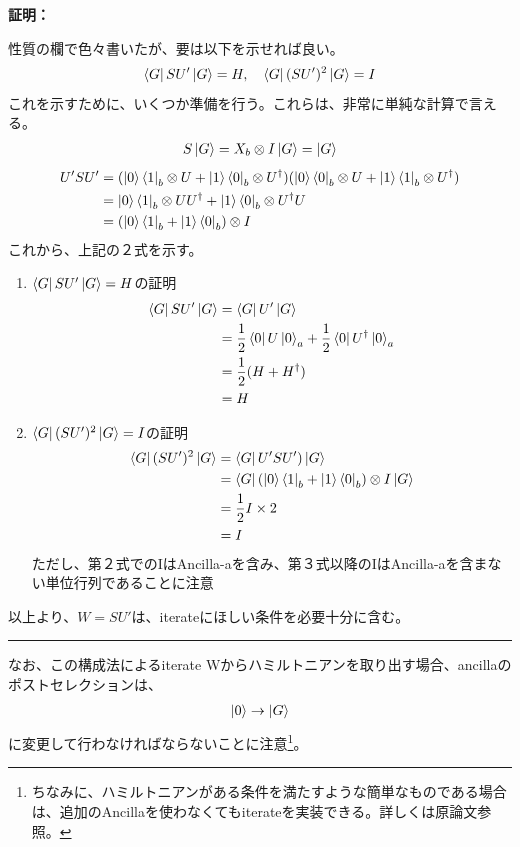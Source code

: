 \documentclass[a4paper,10.5pt]{article}
\numberwithin{equation}{section}
\newenvironment{proofbox}
{\begin{prooflabel}\textbf{証明：}\end{prooflabel}\vspace{0.8em}}
{\par\vspace{1em}\hrule\vspace{1em}}
\begin{document}
\begin{proofbox}
    性質の欄で色々書いたが、要は以下を示せれば良い。
    \begin{align*}
    \bra{G}SU'\ket{G}=H,\quad \bra{G}(SU')^{2}\ket{G}=I
    \end{align*}
    これを示すために、いくつか準備を行う。これらは、非常に単純な計算で言える。
    \begin{align*}
        S\ket{G}=X_{b}\otimes I\ket{G}=\ket{G}
    \end{align*}
    \begin{align*}
        U'SU'&=(\ket{0}\bra{1}_{b}\otimes U+\ket{1}\bra{0}_{b}\otimes U^{\dagger})(\ket{0}\bra{0}_{b}\otimes U+\ket{1}\bra{1}_{b}\otimes U^{\dagger})\\
        &=\ket{0}\bra{1}_{b}\otimes UU^{\dagger}+\ket{1}\bra{0}_{b}\otimes U^{\dagger}U\\
        &=(\ket{0}\bra{1}_{b}+\ket{1}\bra{0}_{b} )\otimes I
    \end{align*}
    これから、上記の２式を示す。
    \begin{enumerate}
        \item $\bra{G}SU'\ket{G}=H$の証明
        \begin{align*}
            \bra{G}SU'\ket{G}&=\bra{G}U'\ket{G}\\
            &=\frac{1}{2}\bra{0}U\ket{0}_{a}+\frac{1}{2}\bra{0}U^{\dagger}\ket{0}_{a}\\
            &=\frac{1}{2}(H+H^{\dagger})\\
            &=H
        \end{align*}
        \item $\bra{G}(SU')^{2}\ket{G}=I$の証明
        \begin{align*}
            \bra{G}(SU')^{2}\ket{G}&=\bra{G}U'SU')\ket{G}\\
            &=\bra{G}(\ket{0}\bra{1}_{b}+\ket{1}\bra{0}_{b} )\otimes I\ket{G}\\
            &=\frac{1}{2}I\times 2\\
            &=I
        \end{align*}
        ただし、第２式でのIはAncilla-aを含み、第３式以降のIはAncilla-aを含まない単位行列であることに注意
    \end{enumerate}
    以上より、$W=SU'$は、iterateにほしい条件を必要十分に含む。
\end{proofbox}
なお、この構成法によるiterate Wからハミルトニアンを取り出す場合、ancillaのポストセレクションは、
\begin{align*}
    \ket{0}\to \ket{G}
\end{align*}
に変更して行わなければならないことに注意\footnote{ちなみに、ハミルトニアンがある条件を満たすような簡単なものである場合は、追加のAncillaを使わなくてもiterateを実装できる。詳しくは原論文参照。}。
\end{document}
